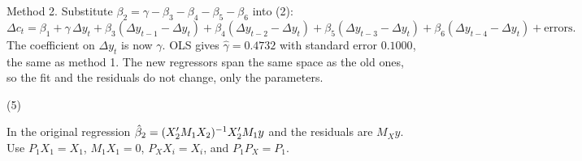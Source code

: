 \documentclass[11pt]{article}
\renewcommand{\question}[1]{\par\needspace{4\baselineskip}\medskip\noindent #1\par\nobreak\smallskip}
\begin{document}
Method 2. Substitute $\beta_{2} = \gamma - \beta_{3} - \beta_{4} - \beta_{5} - \beta_{6}$ into (2):
\[
  \Delta c_{t} = \beta_{1} + \gamma\,\Delta y_{t}
  + \beta_{3}(\Delta y_{t-1} - \Delta y_{t})
  + \beta_{4}(\Delta y_{t-2} - \Delta y_{t})
  + \beta_{5}(\Delta y_{t-3} - \Delta y_{t})
  + \beta_{6}(\Delta y_{t-4} - \Delta y_{t}) + \text{errors}.
\]
The coefficient on $\Delta y_{t}$ is now $\gamma$. OLS gives $\hat\gamma = 0.4732$ with standard error $0.1000$, the same as method 1.
The new regressors span the same space as the old ones, so the fit and the residuals do not change, only the parameters.

\question{(5)}
In the original regression $\hat\beta_{2} = (X_{2}^{\prime} M_{1}X_{2})^{-1}X_{2}^{\prime} M_{1}y$ and the residuals are $M_{X}y$.
Use $P_{1}X_{1} = X_{1}$, $M_{1}X_{1} = 0$, $P_{X}X_{i} = X_{i}$, and $P_{1}P_{X} = P_{1}$.
\end{document}
